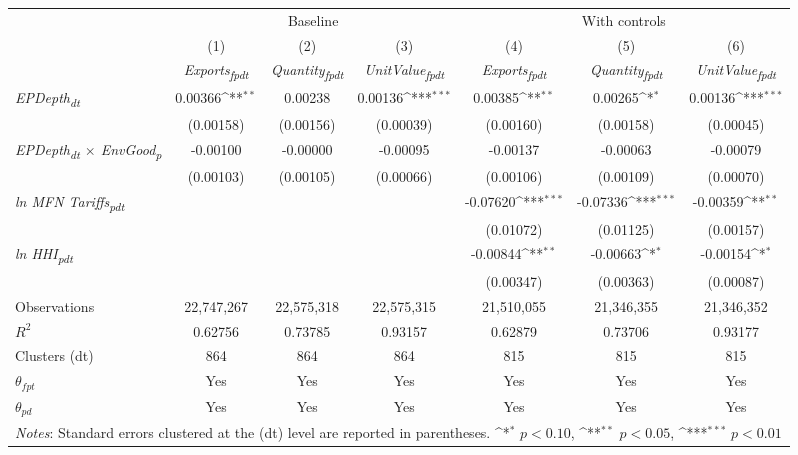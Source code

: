 {
\def\sym#1{\ifmmode^{#1}\else\(^{#1}\)\fi}
\begin{tabular}{l*{6}{c}}
\toprule
&\multicolumn{3}{c}{Baseline}&\multicolumn{3}{c}{With controls}\\\cmidrule(lr){2-4}\cmidrule(lr){5-7}
&(1)&(2)&(3)&(4)&(5)&(6)\\
&\textit{Exports\textsubscript{fpdt}}&\textit{Quantity\textsubscript{fpdt}}&\textit{UnitValue\textsubscript{fpdt}}&\textit{Exports\textsubscript{fpdt}}&\textit{Quantity\textsubscript{fpdt}}&\textit{UnitValue\textsubscript{fpdt}}\\
\midrule
\textit{EPDepth\textsubscript{dt}} & 0.00366\sym{**} & 0.00238 & 0.00136\sym{***} & 0.00385\sym{**} & 0.00265\sym{*} & 0.00136\sym{***}\\
 & (0.00158) & (0.00156) & (0.00039) & (0.00160) & (0.00158) & (0.00045)\\
\addlinespace
\textit{EPDepth\textsubscript{dt} $\times$ EnvGood\textsubscript{p}} & -0.00100 & -0.00000 & -0.00095 & -0.00137 & -0.00063 & -0.00079\\
 & (0.00103) & (0.00105) & (0.00066) & (0.00106) & (0.00109) & (0.00070)\\
\addlinespace
\textit{ln MFN Tariffs\textsubscript{pdt}} &  &  &  & -0.07620\sym{***} & -0.07336\sym{***} & -0.00359\sym{**}\\
 &  &  &  & (0.01072) & (0.01125) & (0.00157)\\
\addlinespace
\textit{ln HHI\textsubscript{pdt}} &  &  &  & -0.00844\sym{**} & -0.00663\sym{*} & -0.00154\sym{*}\\
 &  &  &  & (0.00347) & (0.00363) & (0.00087)\\
\midrule
Observations & 22,747,267 & 22,575,318 & 22,575,315 & 21,510,055 & 21,346,355 & 21,346,352\\
$R^{2}$ & 0.62756 & 0.73785 & 0.93157 & 0.62879 & 0.73706 & 0.93177\\
Clusters (dt) & 864 & 864 & 864 & 815 & 815 & 815\\
$\theta_{fpt}$ & Yes & Yes & Yes & Yes & Yes & Yes\\
$\theta_{pd}$ & Yes & Yes & Yes & Yes & Yes & Yes\\
\bottomrule
\multicolumn{7}{l}{\footnotesize \textit{Notes}: Standard errors clustered at the (dt) level are reported in parentheses. \sym{*} \(p<0.10\), \sym{**} \(p<0.05\), \sym{***} \(p<0.01\)}\\
\end{tabular}
}
